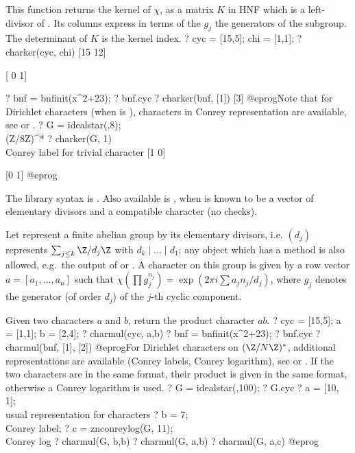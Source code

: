 This function returns the kernel of $\chi$, as a matrix $K$ in HNF which is a
left-divisor of . Its columns express in terms of
the $g_j$ the generators of the subgroup. The determinant of $K$ is the
kernel index.
\bprog
? cyc = [15,5]; chi = [1,1];
? charker(cyc, chi)
[15 12]

[ 0  1]

? bnf = bnfinit(x^2+23);
? bnf.cyc
? charker(bnf, [1])
[3]
@eprog\noindent Note that for Dirichlet characters (when  is
), characters in Conrey representation are available,
see  or .
\bprog
? G = idealstar(,8);  \\ (Z/8Z)^*
? charker(G, 1) \\ Conrey label for trivial character
[1 0]

[0 1]
@eprog

The library syntax is .
Also available is
, when  is known to
be a vector of elementary divisors and  a compatible character
(no checks).

\label{se:charmul}
Let  represent a finite abelian group by its elementary
divisors, i.e. $(d_j)$ represents $\sum_{j \leq k} \Z/d_j\Z$ with $d_k
\mid \dots \mid d_1$; any object which has a  method is also
allowed, e.g.~the output of  or . A character
on this group is given by a row vector $a = [a_1,\ldots,a_n]$ such that
$\chi(\prod g_j^{n_j}) = \exp(2\pi i\sum a_j n_j / d_j)$, where $g_j$ denotes
the generator (of order $d_j$) of the $j$-th cyclic component.

Given two characters $a$ and $b$, return the product character $ab$.
\bprog
? cyc = [15,5]; a = [1,1]; b =  [2,4];
? charmul(cyc, a,b)
? bnf = bnfinit(x^2+23);
? bnf.cyc
? charmul(bnf, [1], [2])
@eprog\noindent For Dirichlet characters on  $(\Z/N\Z)^*$, additional
representations are available (Conrey labels, Conrey logarithm), see
 or . If the two characters are in
the same format, their
product is given in the same format, otherwise a Conrey logarithm is used.
\bprog
? G = idealstar(,100);
? G.cyc
? a = [10, 1]; \\ usual representation for characters
? b = 7; \\ Conrey label;
? c = znconreylog(G, 11); \\ Conrey log
? charmul(G, b,b)
? charmul(G, a,b)
? charmul(G, a,c)
@eprog

